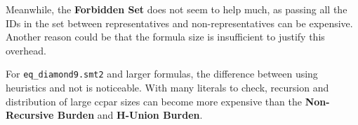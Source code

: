 \documentclass[11pt,a4paper]{article}
\begin{document}
    Meanwhile, the \textbf{Forbidden Set} does not seem to help much, as passing all the IDs in the set between representatives and non-representatives can be expensive. Another reason could be that the formula size is insufficient to justify this overhead.

    For \texttt{eq\_diamond9.smt2} and larger formulas, the difference between using heuristics and not is noticeable. With many literals to check, recursion and distribution of large ccpar sizes can become more expensive than the \textbf{Non-Recursive Burden} and \textbf{H-Union Burden}.


    
        
\end{document}
